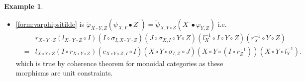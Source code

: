 \documentclass[nosumlimits,twoside]{amsart}
\theoremstyle{definition}
\newtheorem{example}[example]{\sc Example}
\theoremstyle{remark}
\def\revsn{\text{-}}
\newenvironment{invisible}{{\noindent\sc \colorbox{yellow}{Invisible:}\;}\color{gray}}{\medskip}
\begin{document}
\begin{example}
\begin{invisible}
\begin{itemize}
which is equivalent to $\left( X\circ \sigma _{I\circ I,Z}\circ Y\right)
\left( X\circ I\circ I\circ \sigma _{Y,Z}\right) \left( X\circ I\circ
l_{Y}^{-1}\circ Z\right) \\=\left( X\circ \sigma _{I,Z}\circ I\circ Y\right)
\left( r_{X}^{-1}\circ r_{Z}^{-1}\circ Y\right) \left( r_{X\circ Z\circ
Y}\right) \left( X\circ \sigma _{I,Z\circ Y}\right) \left( X\circ I\circ
\sigma _{Y,Z}\right) $ 

i.e. $\left( X\circ \sigma _{I\circ I,Z}\circ
Y\right) \left( X\circ I\circ I\circ \sigma _{Y,Z}\right) \left( X\circ
I\circ l_{Y\circ Z}^{-1}\right) \\=\left( X\circ \sigma _{I,Z}\circ I\circ
Y\right) \left( r_{X}^{-1}\circ r_{Z}^{-1}\circ Y\right) \left( r_{X\circ
Z\circ Y}\right) \left( X\circ \sigma _{I,Z\circ Y}\right) \left( X\circ
I\circ \sigma _{Y,Z}\right) $

i.e. $\left( X\circ \sigma _{I\circ I,Z}\circ Y\right) \left( X\circ I\circ
l_{Z\circ Y}^{-1}\right) \left( X\circ I\circ \sigma _{Y,Z}\right) \\=\left(
X\circ \sigma _{I,Z}\circ I\circ Y\right) \left( r_{X}^{-1}\circ
r_{Z}^{-1}\circ Y\right) \left( r_{X\circ Z\circ Y}\right) \left( X\circ
\sigma _{I,Z\circ Y}\right) \left( X\circ I\circ \sigma _{Y,Z}\right) $ 

i.e.
$\left( X\circ \sigma _{I\circ I,Z}\circ Y\right) \left( X\circ I\circ
l_{Z\circ Y}^{-1}\right) =\left( X\circ \sigma _{I,Z}\circ I\circ Y\right)
\left( r_{X}^{-1}\circ r_{Z}^{-1}\circ Y\right) \left( r_{X\circ Z\circ
Y}\right) \left( X\circ \sigma _{I,Z\circ Y}\right) $ which is true by
coherence theorem for monoidal categories as these morphisms are unit
constraints.

\item \eqref{form:varphipsitilde} is $\widetilde{\varphi }_{X\circ Y,Z}\left(
\psi _{X,Y}\bullet Z^{\revsn }\right) =\widetilde{\psi }_{X,Y\circ Z}\left(
X^{\revsn }\bullet \varphi _{Y,Z}\right) $ i.e.
\begin{eqnarray*}
&&r_{X\circ Y\circ Z}\left( l_{X\circ Y\circ Z}\circ I\right) \left( I\circ
\sigma _{I,X\circ Y\circ Z}\right) \left( J\circ \sigma _{X,I}\circ Y\circ
Z\right) \left( l_{X}^{-1}\circ I\circ Y\circ Z\right) \left(
r_{X}^{-1}\circ  Y\circ Z\right)  \\
&=&l_{X\circ Y\circ Z}\left( I\circ r_{X\circ Y\circ Z}\right) \left(
c_{X\circ Y\circ Z,I}\circ I\right) \left( X\circ Y\circ \sigma _{I,Z}\circ
J\right) \left( X\circ Y\circ \left( I\circ r_{Z}^{-1}\right) \right) \left(
X\circ Y\circ l_{Y}^{-1}\right) .
\end{eqnarray*}%
which is true by coherence theorem for monoidal categories as these
morphisms are unit constraints.


\end{itemize}
\end{invisible}
\end{example}
\end{document}
